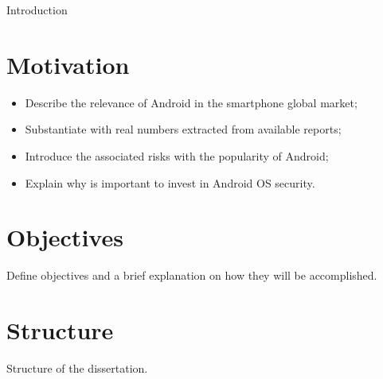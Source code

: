 Introduction

\section{Motivation}
\label{sec:motivation}

\begin{itemize}
\item Describe the relevance of Android in the smartphone global market;\\
\item Substantiate with real numbers extracted from available reports;\\
\item Introduce the associated risks with the popularity of Android;\\
\item Explain why is important to invest in Android OS security.
\end{itemize}

\section{Objectives}
\label{sec:objectives}

Define objectives and a brief explanation on how they will be accomplished.

\section{Structure}

Structure of the dissertation.
